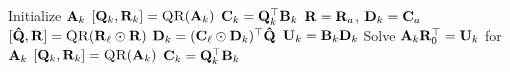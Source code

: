 
\begin{algorithmic}[1]
        \State Initialize $\mathbf{A}_k$
        \State $[\mat{Q}_k,\mat{R}_k] = \Call{QR}{\mat{A}_k}$  
        \State $\mathbf{C}_k = \mathbf{Q}_k^\top\mathbf{B}_k$   
      \EndFor
           
          \State $\mathbf{R} = \mathbf{R}_a$, $\mathbf{D}_k = \mathbf{C}_a$ 
              \State $[\M[\hat]{Q},\mat{R}] = \Call{QR}{\mat{R}_\ell \odot \mat{R}}$ \label{l:pair-QR-R} 
              \State $\mat{D}_k = (\mat{C}_\ell \odot \mat{D}_k)^\top\M[\hat]{Q}$ \label{l:pair-QR-Rapply} 
            \EndIf
          \EndFor
          \State $\mathbf{U}_k = \mathbf{B}_k\mathbf{D}_k$ \label{l:Pair-K-matmul} 
          \State Solve $  \mathbf{A}_k\mathbf{R}_0^\top = \mathbf{U}_k$ for $\mathbf{A}_k$ \label{l:Pair-K-solve}     
          \State $[\mat{Q}_k,\mat{R}_k] = \Call{QR}{\mat{A}_k}$ \label{l:Pair-K-update}    
          \State $\mathbf{C}_k = \mathbf{Q}_k^\top\mathbf{B}_k$ \label{l:Pair-K-apply}   
        \EndFor
      \EndWhile
    \EndFunction
  \end{algorithmic}